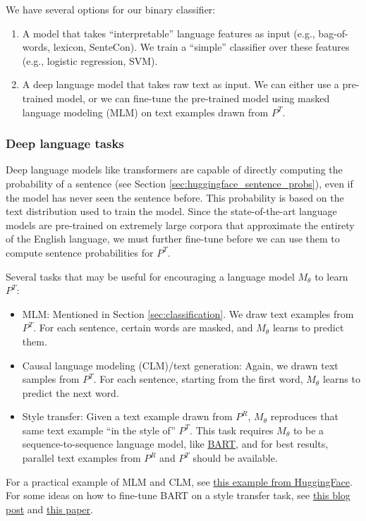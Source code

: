 \documentclass{article}
\begin{document}
We have several options for our binary classifier:
\begin{enumerate}
    \item A model that takes ``interpretable'' language features as input (e.g., bag-of-words, lexicon, SenteCon). We train a ``simple'' classifier over these features (e.g., logistic regression, SVM).
    \item A deep language model that takes raw text as input. We can either use a pre-trained model, or we can fine-tune the pre-trained model using masked language modeling (MLM) on text examples drawn from $P^T$.
\end{enumerate}

\subsubsection{Deep language tasks}

Deep language models like transformers are capable of directly computing the probability of a sentence (see Section \ref{sec:huggingface_sentence_probs}), even if the model has never seen the sentence before. This probability is based on the text distribution used to train the model. Since the state-of-the-art language models are pre-trained on extremely large corpora that approximate the entirety of the English language, we must further fine-tune before we can use them to compute sentence probabilities for $P^T$.

Several tasks that may be useful for encouraging a language model $M_\theta$ to learn $P^T$:
\begin{itemize}
    \item MLM: Mentioned in Section \ref{sec:classification}. We draw text examples from $P^T$. For each sentence, certain words are masked, and $M_\theta$ learns to predict them.
    \item Causal language modeling (CLM)/text generation: Again, we drawn text samples from $P^T$. For each sentence, starting from the first word, $M_\theta$ learns to predict the next word.
    \item Style transfer: Given a text example drawn from $P^R$, $M_\theta$ reproduces that same text example ``in the style of'' $P^T$. This task requires $M_\theta$ to be a sequence-to-sequence language model, like \href{https://arxiv.org/pdf/1910.13461.pdf}{BART}, and for best results, parallel text examples from $P^R$ and $P^T$ should be available.
\end{itemize}

For a practical example of MLM and CLM, see \href{https://huggingface.co/docs/transformers/tasks/language_modeling}{this example from HuggingFace}. For some ideas on how to fine-tune BART on a style transfer task, see \href{https://blog.fastforwardlabs.com/2022/05/05/neutralizing-subjectivity-bias-with-huggingface-transformers.html}{this blog post} and \href{https://arxiv.org/pdf/2105.06947.pdf}{this paper}.
\end{document}
